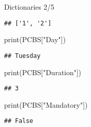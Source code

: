 \documentclass[
  8pt,
  ignorenonframetext,
]{beamer}
\newenvironment{Shaded}{\begin{snugshade}}{\end{snugshade}}
\newcommand{\BuiltInTok}[1]{#1}
\newcommand{\NormalTok}[1]{#1}
\newcommand{\StringTok}[1]{\textcolor[rgb]{0.31,0.60,0.02}{#1}}
\begin{document}
\begin{frame}[fragile]{Dictionaries 2/5}
\begin{itemize}[<+->]
\begin{verbatim}
## ['1', '2']
\end{verbatim}

\begin{Shaded}
\begin{Highlighting}[]
\BuiltInTok{print}\NormalTok{(PCBS[}\StringTok{"Day"}\NormalTok{])}
\end{Highlighting}
\end{Shaded}

\begin{verbatim}
## Tuesday
\end{verbatim}

\begin{Shaded}
\begin{Highlighting}[]
\BuiltInTok{print}\NormalTok{(PCBS[}\StringTok{"Duration"}\NormalTok{])}
\end{Highlighting}
\end{Shaded}

\begin{verbatim}
## 3
\end{verbatim}

\begin{Shaded}
\begin{Highlighting}[]
\BuiltInTok{print}\NormalTok{(PCBS[}\StringTok{"Mandatory"}\NormalTok{])}
\end{Highlighting}
\end{Shaded}

\begin{verbatim}
## False
\end{verbatim}
\end{itemize}
\end{frame}
\end{document}
